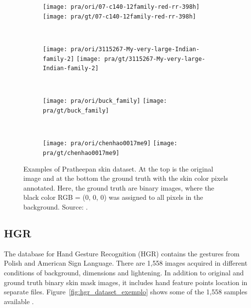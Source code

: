 \begin{figure}[H]
    \centering
    \begin{subfigure}[t]{0.238\textwidth}
        \texttt{[image: pra/ori/07-c140-12family-red-rr-398h]}
        \texttt{[image: pra/gt/07-c140-12family-red-rr-398h]}
    \end{subfigure}
    ~
    \begin{subfigure}[t]{0.25\textwidth}
        \texttt{[image: pra/ori/3115267-My-very-large-Indian-family-2]}
        \texttt{[image: pra/gt/3115267-My-very-large-Indian-family-2]}
    \end{subfigure}
    ~
    \begin{subfigure}[t]{0.25\textwidth}
        \texttt{[image: pra/ori/buck\_family]}
        \texttt{[image: pra/gt/buck\_family]}
    \end{subfigure}
    ~
    \begin{subfigure}[t]{0.141\textwidth}
        \texttt{[image: pra/ori/chenhao0017me9]}
        \texttt{[image: pra/gt/chenhao0017me9]}
    \end{subfigure}
    \caption[Examples of Pratheepan skin dataset]{Examples of Pratheepan skin dataset. At the top is the original image and at the bottom the ground truth with the skin color pixels annotated. Here, the ground truth are binary images, where the black color RGB = (0, 0, 0) was assigned to all pixels in the background. Source: \citet{tan:12}.}
    \label{fig:pra_dataset_exemplo}
\end{figure}


\subsection{HGR}
\label{sec:datasets_hgr}
The database for Hand Gesture Recognition (HGR) contains the gestures from Polish and American Sign Language. There are 1,558 images acquired in different conditions of background, dimensions and lightening. In addition to original and ground truth binary skin mask images, it includes hand feature points location in separate files. Figure~\ref{fig:hgr_dataset_exemplo} shows some of the 1,558 samples available \citep{kawulok:14, nalepa:14, grzejszczak:16}.



